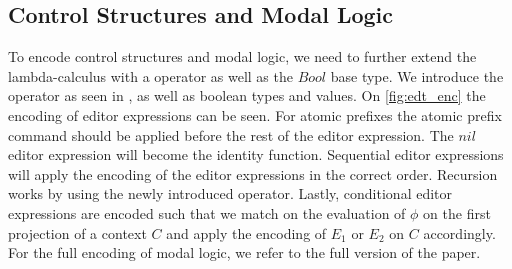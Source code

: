\documentclass[sigplan,screen]{acmart}
\begin{document}
\subsection{Control Structures and Modal Logic}
To encode control structures and modal logic, we need to further extend the lambda-calculus with a \fix operator as well as the $Bool$ base type. We introduce the \fix operator as seen in \cite{types_programming_languages}, as well as boolean types and values. 
On \cref{fig:edt_enc} the encoding of editor expressions can be seen. For atomic prefixes the atomic prefix command should be applied before the rest of the editor expression. The $nil$ editor expression will become the identity function. Sequential editor expressions will apply the encoding of the editor expressions in the correct order. Recursion works by using the newly introduced \fix operator. Lastly, conditional editor expressions are encoded such that we match on the evaluation of $\phi$ on the first projection of a context $C$ and apply the encoding of $E_1$ or $E_2$ on $C$ accordingly. For the full encoding of modal logic, we refer to the full version of the paper.


\end{document}
